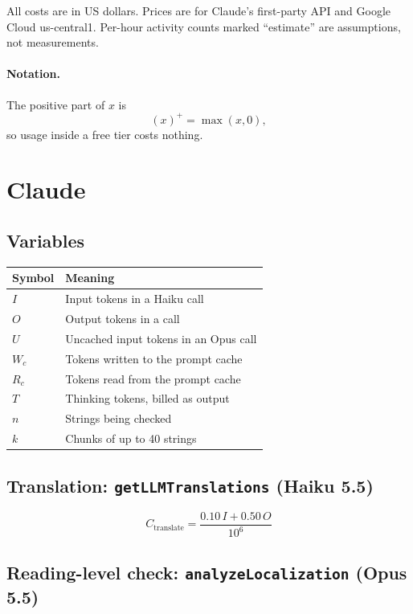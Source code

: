 \documentclass{article}
\newcommand{\pos}[1]{\left(#1\right)^{+}}
\begin{document}
All costs are in US dollars. Prices are for Claude's first-party API and
Google Cloud us-central1. Per-hour activity counts marked ``estimate'' are
assumptions, not measurements.

\paragraph{Notation.} The positive part of $x$ is
\[
\pos{x} = \max(x, 0),
\]
so usage inside a free tier costs nothing.

\section{Claude}

\subsection{Variables}

\begin{center}
\begin{tabular}{ll}
\toprule
Symbol & Meaning \\
\midrule
$I$ & Input tokens in a Haiku call \\
$O$ & Output tokens in a call \\
$U$ & Uncached input tokens in an Opus call \\
$W_c$ & Tokens written to the prompt cache \\
$R_c$ & Tokens read from the prompt cache \\
$T$ & Thinking tokens, billed as output \\
$n$ & Strings being checked \\
$k$ & Chunks of up to 40 strings \\
\bottomrule
\end{tabular}
\end{center}

\subsection{Translation: \texttt{getLLMTranslations} (Haiku 5.5)}

\[
C_{\text{translate}} = \frac{0.10\,I + 0.50\,O}{10^{6}}
\]

\subsection{Reading-level check: \texttt{analyzeLocalization} (Opus 5.5)}
\end{document}
